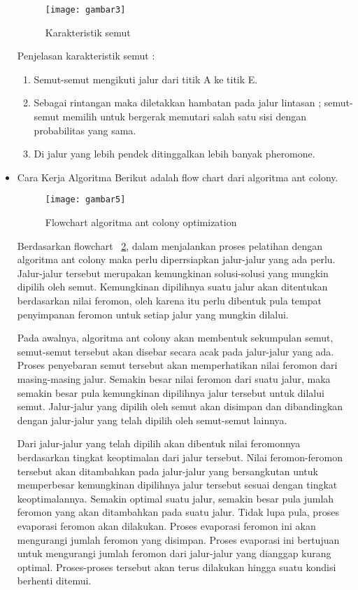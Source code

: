 \begin{itemize}
	\begin{figure}[H]
	\centering
	\texttt{[image: gambar3]}
	\caption[Contoh Karakteristik Semut] {Karakteristik semut}
	\label{fig:karakteristiksemut1}
	\end{figure}

Penjelasan karakteristik semut :
\begin{enumerate}
	\item Semut-semut mengikuti jalur dari titik A ke titik E.
	\item Sebagai rintangan maka diletakkan hambatan pada jalur lintasan ; semut-semut memilih untuk bergerak memutari salah satu sisi dengan probabilitas yang sama.
	\item Di jalur yang lebih pendek ditinggalkan lebih banyak pheromone.\\	
\end{enumerate}

\item Cara Kerja Algoritma
Berikut adalah flow chart dari algoritma ant colony.
\begin{figure}[H]
	\centering
	\texttt{[image: gambar5]}
	\caption[Flowchart ACO] {Flowchart algoritma ant colony optimization}
	\label{fig:flowchartACO}
\end{figure}
Berdasarkan flowchart ~\ref{fig:flowchartACO}, dalam menjalankan proses pelatihan dengan algoritma ant colony maka perlu diperrsiapkan
jalur-jalur yang ada perlu. Jalur-jalur tersebut merupakan kemungkinan
solusi-solusi yang mungkin dipilih oleh semut. Kemungkinan dipilihnya suatu jalur akan ditentukan berdasarkan nilai feromon, oleh karena itu perlu dibentuk pula tempat penyimpanan feromon untuk setiap jalur yang mungkin dilalui.

Pada awalnya, algoritma ant colony akan membentuk sekumpulan semut, semut-semut tersebut akan disebar secara acak pada jalur-jalur yang ada. Proses penyebaran semut tersebut akan memperhatikan nilai feromon dari masing-masing jalur. Semakin besar nilai feromon dari suatu jalur, maka semakin besar pula kemungkinan dipilihnya jalur tersebut untuk dilalui semut. Jalur-jalur yang dipilih oleh semut akan disimpan dan dibandingkan dengan jalur-jalur yang telah dipilih oleh semut-semut lainnya.

Dari jalur-jalur yang telah dipilih akan dibentuk nilai feromonnya berdasarkan tingkat keoptimalan
dari jalur tersebut. Nilai feromon-feromon tersebut akan ditambahkan pada jalur-jalur yang bersangkutan untuk memperbesar kemungkinan dipilihnya jalur tersebut sesuai dengan tingkat keoptimalannya. Semakin optimal suatu jalur, semakin besar pula jumlah feromon yang akan ditambahkan pada suatu jalur. Tidak lupa pula, proses evaporasi feromon akan dilakukan. Proses evaporasi feromon ini akan mengurangi jumlah feromon yang disimpan. Proses evaporasi ini bertujuan untuk mengurangi jumlah feromon dari jalur-jalur yang dianggap kurang optimal. Proses-proses tersebut akan terus
dilakukan hingga suatu kondisi berhenti ditemui.


\end{itemize}
